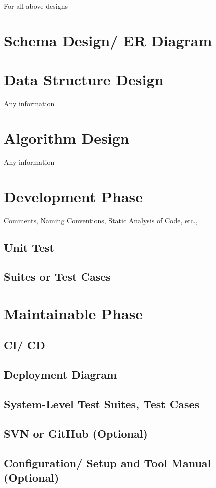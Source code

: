 For all above designs

\section{Schema Design/ ER Diagram}
\section{Data Structure Design}
Any information
\section{Algorithm Design}
Any information
\section{Development Phase}
Comments, Naming Conventions, Static Analysis of Code, etc.,
\subsection{Unit Test}
\subsection{Suites or Test Cases}
\section{Maintainable Phase}
\subsection{CI/ CD}
\subsection{Deployment Diagram}
\subsection{System-Level Test Suites, Test      Cases}
\subsection{SVN or GitHub (Optional)}
\subsection{Configuration/ Setup and Tool Manual (Optional)}

